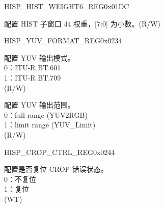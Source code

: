 \begin{register}{H}{ISP\_HIST\_WEIGHT6\_REG}{0x01DC}\label{regdesc:ISPHISTWEIGHT6REG}
%
%
\regnewline%
\begin{regdesc}\begin{reglist}
\label{fielddesc:ISPHISTWEIGHT44}\item [ISP\_HIST\_WEIGHT\_44] 配置 HIST 子窗口 44 权重，[7:0] 为小数。(R/W)
\end{reglist}\end{regdesc}
\end{register}












\begin{register}{H}{ISP\_YUV\_FORMAT\_REG}{0x0234}\label{regdesc:ISPYUVFORMATREG}
%
%
%
\regnewline%
\begin{regdesc}\begin{reglist}
\label{fielddesc:ISPYUVMODE}\item [ISP\_YUV\_MODE] 配置 YUV 输出模式。\\0：ITU-R BT.601\\1：ITU-R BT.709\\(R/W)
\label{fielddesc:ISPYUVRANGE}\item [ISP\_YUV\_RANGE] 配置 YUV 输出范围。\\0：full range (YUV2RGB)\\1：limit range (YUV\_Limit)\\(R/W)
\end{reglist}\end{regdesc}
\end{register}






\begin{register}{H}{ISP\_CROP\_CTRL\_REG}{0x0244}\label{regdesc:ISPCROPCTRLREG}
%
%
\regnewline%
\begin{regdesc}\begin{reglist}
\label{fielddesc:ISPCROPSFTRST}\item [ISP\_CROP\_SFT\_RST] 配置是否复位 CROP 错误状态。\\
0：不复位\\
1：复位\\(WT)
\end{reglist}\end{regdesc}
\end{register}


